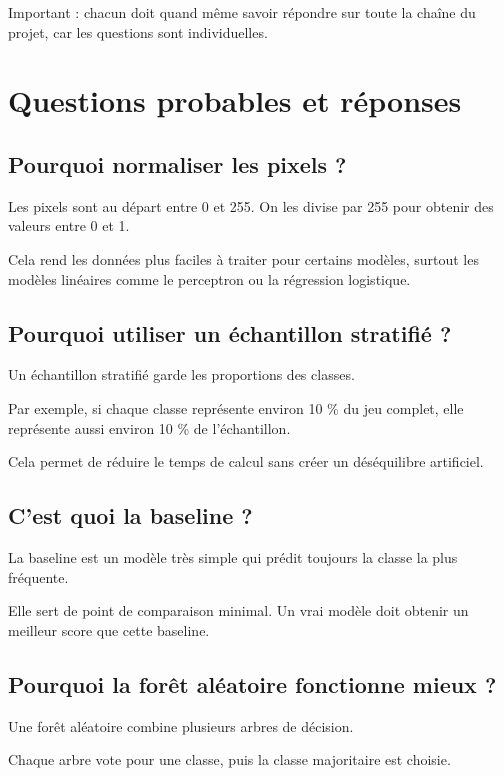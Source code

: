 \documentclass[11pt,a4paper]{article}
\begin{document}
Important : chacun doit quand même savoir répondre sur toute la chaîne du projet, car les questions sont individuelles.

\section{Questions probables et réponses}

\subsection{Pourquoi normaliser les pixels ?}

Les pixels sont au départ entre 0 et 255. On les divise par 255 pour obtenir des valeurs entre 0 et 1.

Cela rend les données plus faciles à traiter pour certains modèles, surtout les modèles linéaires comme le perceptron ou la régression logistique.

\subsection{Pourquoi utiliser un échantillon stratifié ?}

Un échantillon stratifié garde les proportions des classes.

Par exemple, si chaque classe représente environ 10 \% du jeu complet, elle représente aussi environ 10 \% de l'échantillon.

Cela permet de réduire le temps de calcul sans créer un déséquilibre artificiel.

\subsection{C'est quoi la baseline ?}

La baseline est un modèle très simple qui prédit toujours la classe la plus fréquente.

Elle sert de point de comparaison minimal. Un vrai modèle doit obtenir un meilleur score que cette baseline.

\subsection{Pourquoi la forêt aléatoire fonctionne mieux ?}

Une forêt aléatoire combine plusieurs arbres de décision.

Chaque arbre vote pour une classe, puis la classe majoritaire est choisie.
\end{document}
